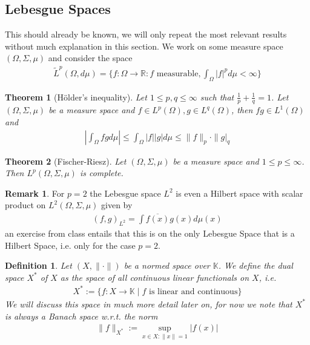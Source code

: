 \documentclass[11pt,a4paper]{article}
\newtheorem{thm}{Theorem}[section]
\newtheorem{defn}{Definition}[section]
\theoremstyle{definition}
\newtheorem{rem}{Remark}[section]
\begin{document}
\subsection{Lebesgue Spaces}
This should already be known, we will only repeat the most relevant results without much explanation in this section. We work on some measure space $(\Omega, \Sigma, \mu)$ and consider the space 
\begin{align*}
\tilde{L}^p( \Omega, d \mu)= \lbrace f: \Omega \to \mathbb{R} : f \text{ measurable}, \int_\Omega |f|^p d \mu < \infty \rbrace 
\end{align*}
\begin{thm}[Hölder's inequality] Let $1 \leq p,q \leq \infty$ such that $\frac{1}{p} + \frac{1}{q}=1$. Let $( \Omega, \Sigma, \mu)$ be a measure space and $f \in L^p( \Omega), g \in L^q( \Omega)$, then $fg \in L^1(\Omega)$ and 
\begin{align*}
\left| \int_\Omega fg d \mu \right| \leq \int_\Omega |f| |g| d \mu \leq \|f\|_p \cdot \|g|_q
\end{align*}
\end{thm}
\newpage
\begin{thm}[Fischer-Riesz] Let $( \Omega, \Sigma, \mu)$ be a measure space and $1 \leq p \leq \infty$. Then $L^p( \Omega, \Sigma, \mu)$ is complete. 
\end{thm}
\begin{rem} For $p=2$ the Lebesgue space $L^2$ is even a Hilbert space with scalar product on $L^2( \Omega, \Sigma, \mu)$ given by 
\begin{align*}
(f,g)_{L^2} = \int \overline{f(x)} g(x) d\mu(x) 
\end{align*}
an exercise from class entails that this is on the only Lebesgue Space that is a Hilbert Space, i.e. only for the case $p=2$. 
\end{rem}
\begin{defn} Let $(X, \| \cdot \|)$ be a normed space over $\mathbb{K}$. We define the dual space $X^*$ of $X$ as the space of all continuous linear functionals on $X$, i.e. 
\begin{align*}
X^*:= \lbrace f: X \to \mathbb{K} \mid f \text{ is linear and continuous} \rbrace
\end{align*}
We will discuss this space in much more detail later on, for now we note that $X^*$ is always a Banach space w.r.t. the norm 
\begin{align*}
\|f\|_{X^*} := \sup_{x \in X: \|x\| = 1 } |f(x)| 
\end{align*}
\end{defn}
\end{document}
